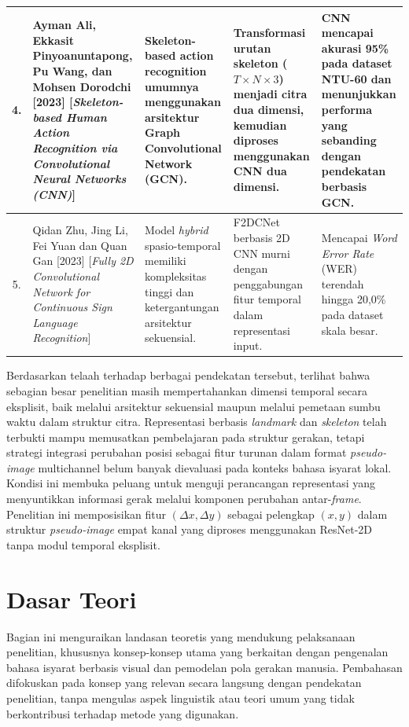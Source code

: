\begin{longtable}{|c|p{}|p{}|p{}|p{}|}
     \hline
     4.
    & Ayman Ali, Ekkasit Pinyoanuntapong, Pu Wang, dan Mohsen Dorodchi [2023] [\textit{Skeleton-based Human Action Recognition via Convolutional Neural Networks (CNN)}] \cite{ali2023skeletonaction}
    & Skeleton-based action recognition umumnya menggunakan arsitektur Graph Convolutional Network (GCN).
    & Transformasi urutan skeleton ($T \times N \times 3$) menjadi citra dua dimensi, kemudian diproses menggunakan CNN dua dimensi.
    & CNN mencapai akurasi 95\% pada dataset NTU-60 dan menunjukkan performa yang sebanding dengan pendekatan berbasis GCN. \\
    \hline
     5.
     & Qidan Zhu, Jing Li, Fei Yuan dan Quan Gan [2023] [\textit{Fully 2D Convolutional Network for Continuous Sign Language Recognition}] \cite{zhu2023f2dcnet}
     & Model \textit{hybrid} spasio-temporal memiliki kompleksitas tinggi dan ketergantungan arsitektur sekuensial.
     & F2DCNet berbasis 2D CNN murni dengan penggabungan fitur temporal dalam representasi input.
     & Mencapai \textit{Word Error Rate} (WER) terendah hingga 20,0\% pada dataset skala besar.\\
 \end{longtable}

\begingroup\sloppy
Berdasarkan telaah terhadap berbagai pendekatan tersebut, terlihat bahwa sebagian besar penelitian masih mempertahankan dimensi temporal secara eksplisit, baik melalui arsitektur sekuensial maupun melalui pemetaan sumbu waktu dalam struktur citra. 
Representasi berbasis \textit{landmark} dan \textit{skeleton} telah terbukti mampu memusatkan pembelajaran pada struktur gerakan, tetapi strategi integrasi perubahan posisi sebagai fitur turunan dalam format \textit{pseudo-image} multichannel belum banyak dievaluasi pada konteks bahasa isyarat lokal. 
Kondisi ini membuka peluang untuk menguji perancangan representasi yang menyuntikkan informasi gerak melalui komponen perubahan antar-\textit{frame}. 
Penelitian ini memposisikan fitur $(\Delta x, \Delta y)$ sebagai pelengkap $(x,y)$ dalam struktur \textit{pseudo-image} empat kanal yang diproses menggunakan ResNet-2D tanpa modul temporal eksplisit.
\endgroup

\section{Dasar Teori} \label{sec:dasar-teori}
Bagian ini menguraikan landasan teoretis yang mendukung pelaksanaan penelitian, khususnya konsep-konsep utama yang berkaitan dengan pengenalan bahasa isyarat berbasis visual dan pemodelan pola gerakan manusia. 
Pembahasan difokuskan pada konsep yang relevan secara langsung dengan pendekatan penelitian, tanpa mengulas aspek linguistik atau teori umum yang tidak berkontribusi terhadap metode yang digunakan. %
